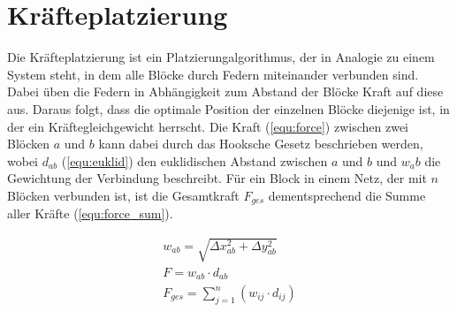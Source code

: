     \section{Kräfteplatzierung}
        Die Kräfteplatzierung ist ein Platzierungalgorithmus, der in Analogie zu einem System steht, in dem alle Blöcke durch Federn miteinander verbunden sind.
        Dabei üben die Federn in Abhängigkeit zum Abstand der Blöcke Kraft auf diese aus.
        Daraus folgt, dass die optimale Position der einzelnen Blöcke diejenige ist, in der ein Kräftegleichgewicht herrscht.
        Die Kraft (\ref{equ:force}) zwischen zwei Blöcken $a$ und $b$ kann dabei durch das Hooksche Gesetz beschrieben werden, wobei $d_{ab}$ (\ref{equ:euklid}) den euklidischen Abstand zwischen $a$ und $b$
        und $w_ab$ die Gewichtung der Verbindung beschreibt. Für ein Block in einem Netz, der mit $n$ Blöcken verbunden ist,
        ist die Gesamtkraft $F_{ges}$ dementsprechend die Summe aller Kräfte (\ref{equ:force_sum}).

        \begin{align}
            \label{equ:euklid}
            w_{ab} = \sqrt{\Delta{}x_{ab}^2 + \Delta{}y_{ab}^2}\\
            \label{equ:force}
            F = w_{ab} \cdot d_{ab}\\
            \label{equ:force_sum}
            F_{ges} = \sum_{j=1}^{n} (w_{ij} \cdot d_{ij})
        \end{align}

